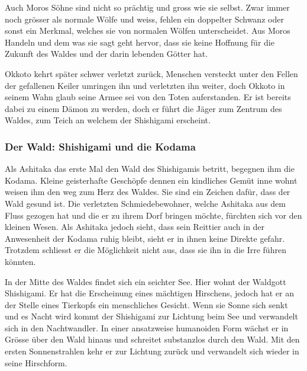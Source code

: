Auch Moros Söhne sind nicht so prächtig und gross wie sie selbst. Zwar immer noch grösser als normale Wölfe und weiss, fehlen ein doppelter Schwanz oder sonst ein Merkmal, welches sie von normalen Wölfen unterscheidet. Aus Moros Handeln und dem was sie sagt geht hervor, dass sie keine Hoffnung für die Zukunft des Waldes und der darin lebenden Götter hat. 

Okkoto kehrt später schwer verletzt zurück, Menschen versteckt unter den Fellen der gefallenen Keiler umringen ihn und verletzten ihn weiter, doch Okkoto in seinem Wahn glaub seine Armee sei von den Toten auferstanden. Er ist bereits dabei zu einem Dämon zu werden, doch er führt die Jäger zum Zentrum des Waldes, zum Teich an welchem der Shishigami erscheint. 

\subsubsection*{Der Wald: Shishigami und die Kodama}
Als Ashitaka das erste Mal den Wald des Shishigamis betritt, begegnen ihm die Kodama. Kleine geisterhafte Geschöpfe dennen ein kindliches Gemüt inne wohnt weisen ihm den weg zum Herz des Waldes. Sie sind ein Zeichen dafür, dass der Wald gesund ist. Die verletzten Schmiedebewohner, welche Ashitaka aus dem Fluss gezogen hat und die er zu ihrem Dorf bringen möchte, fürchten sich vor den kleinen Wesen. Als Ashitaka jedoch sieht, dass sein Reittier auch in der Anwesenheit der Kodama ruhig bleibt, sieht er in ihnen keine Direkte gefahr. Trotzdem schliesst er die Möglichkeit nicht aus, dass sie ihn in die Irre führen könnten.

In der Mitte des Waldes findet sich ein seichter See. Hier wohnt der Waldgott Shishigami. Er hat die Erscheinung eines mächtigen Hirschens, jedoch hat er an der Stelle eines Tierkopfs ein menschliches Gesicht. Wenn sie Sonne sich senkt und es Nacht wird kommt der Shishigami zur Lichtung beim See und verwandelt sich in den Nachtwandler. In einer ansatzweise humanoiden Form wächst er in Grösse über den Wald hinaus und schreitet substanzlos durch den Wald. Mit den ersten Sonnenstrahlen kehr er zur Lichtung zurück und verwandelt sich wieder in seine Hirschform. 

